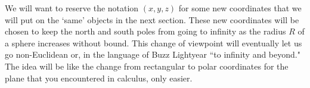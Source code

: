 \documentclass{ximera}
\begin{document}
We will want to reserve the notation $\left(  x,y,z\right)  $ for some new
coordinates that we will put on the `same' objects in the next section. These
new coordinates will be chosen to keep the north and south poles from going to
infinity as the radius $R$ of a sphere increases without bound. This change of
viewpoint will eventually let us go non-Euclidean or, in the language of Buzz
Lightyear \textquotedblleft to infinity and beyond." The idea will be like the
change from rectangular to polar coordinates for the plane that you
encountered in calculus, only easier. 
\end{document}
